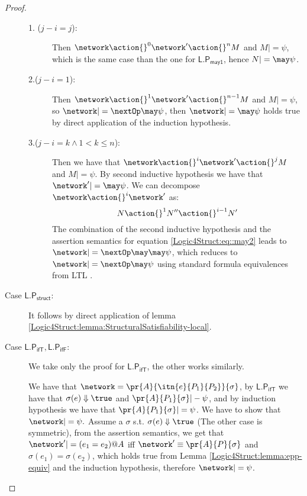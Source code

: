 \begin{proof}
\begin{description}
    \begin{description}

    \item[1. ($j-i = j$):] Then $ \network \action{}^0
      \network' \action{}^n M$ and $M
      |= \psi$, which is the same case than the one for
      $\mathsf{L.P_{may1}}$, hence $N |= \may \psi$.

        \item[2.($j-i=1$):] Then $\network \action{}^1 \network' \action{}^{n-1} M$ and $M
          |= \psi$, so $\network |= \nextOp \may \psi$, then $\network |= \may  \psi$
          holds true by direct application of the induction hypothesis.

        \item[3.($ j-i = k \land 1 < k \leq n$):] Then we have 
          that $ \network \action{}^i \network' \action{}^j M$ and $M
          |= \psi$. By second inductive hypothesis we have that
          $\network' |= \may \psi$. We can decompose
          $\network \action{}^i \network'$ as:
            \begin{equation}\label{Logic4Struct:eq::may2}
              N \action{}^1 N''
              \action{}^{i-1} N'
            \end{equation}
            The combination of the second inductive hypothesis and the
            assertion semantics for equation
            \ref{Logic4Struct:eq::may2} leads to $\network |= \nextOp \may
            \may \psi$, which reduces to $\network |= \nextOp
            \may \psi$ using standard formula equivalences from
            LTL \cite{emerson1991temporal}.
      \end{description}


    \item[Case $\mathsf{L.P_{struct}}$:] It follows by direct
      application of lemma \ref{Logic4Struct:lemma:StructuralSatisfiability-local}.

    
    \item[Case $\mathsf{L.P_{ifT}, L.P_{ifF}}$:] We take only the proof for
    $\mathsf{L.P_{ifT}}$, the other works similarly.
   
    We have that $\network = \pr{A}{\itn{e}{P_1}{P_2}}{\sigma}$, by
    $\mathsf{L.P_{ifT}}$ we have that $\sigma(e) \Downarrow \true $
    and $\pr{A}{P_1}{\sigma} |- \psi$, and by induction hypothesis we have
    that $\pr{A}{P_1}{\sigma} |= \psi$. 
    We have to show that $\network |= \psi.$
    Assume a $\sigma$ s.t. $\sigma ( e )
    \Downarrow \true$ (The other case is symmetric),
    from the assertion semantics, we get that $\network ' |= (e_1 =
    e_2)@A$ iff $\network' \equiv \pr{A}{P}{\sigma}$ and $\sigma(e_1)
    = \sigma(e_2)$, which holds true from Lemma
    \ref{Logic4Struct:lemma:epp-equiv} and the induction hypothesis,
    therefore $\network |= \psi$.


\end{description}
\end{proof}
